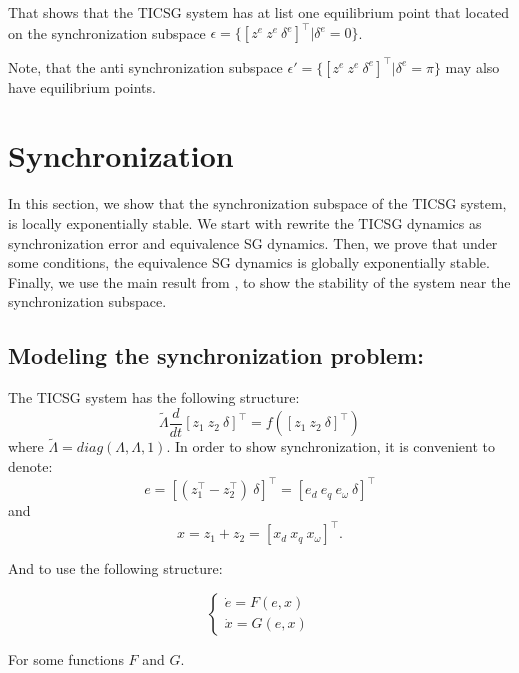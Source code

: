 \documentclass[conference]{IEEEtran}
\begin{document}
That shows that the TICSG system has at list one equilibrium point  that located on the synchronization subspace 
$\epsilon=\{ \left[z^e \ z^e \ \delta^e  \right]^\top   |  \delta^e= 0\}$.

Note, that the anti synchronization subspace  $\epsilon '=\{ \left[z^e \ z^e \ \delta^e  \right]^\top   |  \delta^e=\pi \}$ may also have equilibrium points.

\section{Synchronization}

In this section, we show that the synchronization subspace of the TICSG system, is locally exponentially stable.
We start with rewrite the TICSG dynamics as synchronization error
 and equivalence SG dynamics. Then, we  prove that under
some conditions, the equivalence SG dynamics is globally exponentially
stable. Finally, we use the main result from  \cite{AndrieuJayawardhanaPraly},
to show the stability of the system near the synchronization subspace.

\subsection{Modeling the synchronization problem:}
The TICSG system has the following structure:
$$ \tilde{\Lambda}\frac{d}{dt}\left[z_1\ z_2\ \delta\right]^{\top}= f\left( \left[z_1\ z_2\ \delta\right]^{\top} \right)$$
where $\tilde{\Lambda} = diag \left( \Lambda,\Lambda,1 \right) $.
In order to show synchronization, it is convenient to denote:
$$e =  \left[\left(z_1^\top-z_2^\top \right)\ \delta \right]^\top = \left[e_d\ e_q\ e_{\omega}\ \delta \right]^\top $$
and 
$$x =z_1+z_2 = \left[ x_d\ x_q\ x_\omega\right]^\top.$$  

And to use the following structure:

\begin{equation}
\left\{ \begin{array}{c}
\dot{e}=F(e,x)\\
\dot{x}=G(e,x)
\end{array}\right.\label{eq:sync_sestem}
\end{equation}

For some functions $F$ and $G$. 
\end{document}

